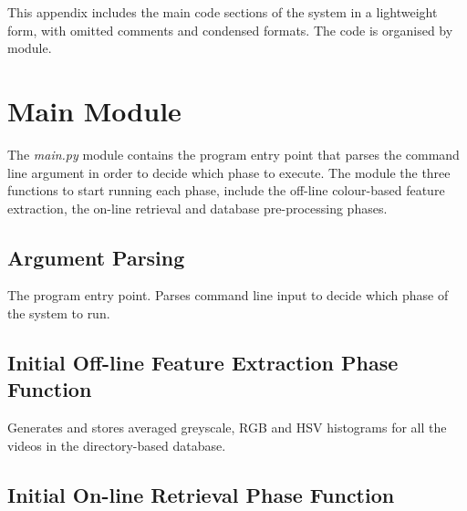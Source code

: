 This appendix includes the main code sections of the system in a lightweight form, with omitted comments and condensed formats. The code is organised by module.


\section{Main Module}

The \textit{main.py} module contains the program entry point that parses the command line argument in order to decide which phase to execute. The module the three functions to start running each phase, include the off-line colour-based feature extraction, the on-line retrieval and database pre-processing phases.

\subsection{Argument Parsing}
\label{sec:code-listings-argument-parsing}

The program entry point. Parses command line input to decide which phase of the system to run.




\subsection{Initial Off-line Feature Extraction Phase Function}
\label{sec:code-off_line_colour_based_feature_extraction_phase}

Generates and stores averaged greyscale, RGB and HSV histograms for all the videos in the directory-based database.




\clearpage
\subsection{Initial On-line Retrieval Phase Function}
\label{sec:code-on_line_retrieval_phase}

